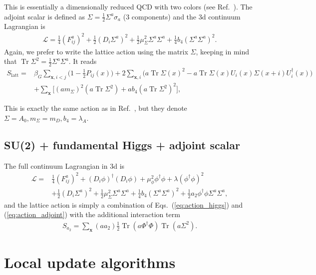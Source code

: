 \documentclass[11pt,a4paper]{article}
\newcommand\Tr{\operatorname{Tr}}
\newcommand\he[1]{#1^\dagger}%
\begin{document}
This is essentially a dimensionally reduced QCD with two colors (see Ref.~\cite{Kajantie:1997tt}). The adjoint scalar is defined as $\Sigma = \frac12 \Sigma^a \sigma_a$ (3 components) and the 3d continuum Lagrangian is 
\begin{align}
\mathcal{L} = \frac14 (F^a_{ij})^2 + \frac12 (D_i \Sigma^a)^2 + \frac12 \mu^2_\Sigma \Sigma^a\Sigma^a + \frac14 b_4 (\Sigma^a\Sigma^a)^2.
\end{align}
Again, we prefer to write the lattice action using the matrix $\Sigma$, keeping in mind that $\Tr \Sigma^2 = \frac12 \Sigma^a \Sigma^a$. It reads
\begin{align}
\label{eq:action_adjoint}
S_\text{latt} =& \beta_G \sum_{\textbf{x}, i<j} \Big(1-\frac12 P_{ij}(x)\Big) + 2\sum_{\textbf{x},i} \Big( a \Tr\Sigma(x)^2 - a \Tr\Sigma(x)U_i(x)\Sigma(x+i)\he U_i(x) \Big) \nonumber \\
& + \sum_\textbf{x} \bigg[ (a m_\Sigma)^2 (a \Tr \Sigma^2) + a b_4 (a \Tr \Sigma^2)^2\bigg],
\end{align}

This is exactly the same action as in Ref.~\cite{Kajantie:1997tt}, but they denote $\Sigma = A_0, m_\Sigma = m_D, b_4 = \lambda_A$.

\subsection{SU(2) + fundamental Higgs + adjoint scalar}

The full continuum Lagrangian in 3d is 
\begin{align}
\mathcal{L} =& \frac14 (F^a_{ij})^2 + (D_i \phi)^\dagger (D_i \phi) + \mu^2_\phi \phi^\dagger\phi + \lambda (\phi^\dagger\phi)^2 \nonumber \\ 
& + \frac12 (D_i \Sigma^a)^2 + \frac12 \mu^2_\Sigma \Sigma^a\Sigma^a + \frac14 b_4 (\Sigma^a\Sigma^a)^2 +\frac12 a_2 \phi^\dagger\phi \Sigma^a\Sigma^a,
\end{align}
and the lattice action is simply a combination of Eqs.~(\ref{eq:action_higgs}) and (\ref{eq:action_adjoint}) with the additional interaction term
\begin{align}
S_{a_2} = \sum_\textbf{x} (a a_2) \frac12 \Tr (a\he\Phi\Phi) \Tr (a\Sigma^2). 
\end{align}


\section{Local update algorithms}
\end{document}
